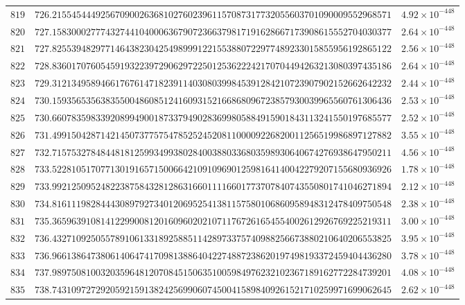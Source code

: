 \documentclass[12pt,reqno]{amsart}
\theoremstyle{remark}
\begin{document}
\begin{longtable}{clc}
$819$ & $726.2155454449256709002636810276023961157087317732055603701090009552968571$ & $4.92\times 10^{-448}$ \\
$820$ & $727.1583000277743274410400063679072366379817191628667173908615552704030377$ & $2.64\times 10^{-448}$ \\
$821$ & $727.8255394829771464382304254989991221553880722977489233015855956192865122$ & $2.56\times 10^{-448}$ \\
$822$ & $728.8360170760545919322397290629722501253622242170704494263213080397435186$ & $2.64\times 10^{-448}$ \\
$823$ & $729.3121349589466176761471823911403080399845391284210723907902152662642232$ & $2.44\times 10^{-448}$ \\
$824$ & $730.1593565356383550048608512416093152166868096723857930039965560761306436$ & $2.53\times 10^{-448}$ \\
$825$ & $730.6607835983392089949001873379490283699805884915901843113241550197685577$ & $2.52\times 10^{-448}$ \\
$826$ & $731.4991504287142145073775754785252452081100009226820011256519986897127882$ & $3.55\times 10^{-448}$ \\
$827$ & $732.7157532784844818125993499380284003880336803598930640674276938647950211$ & $4.56\times 10^{-448}$ \\
$828$ & $733.5228105170771301916571500664210910969012598164140042279207155680936926$ & $1.78\times 10^{-448}$ \\
$829$ & $733.9921250952482238758432812863166011116601773707840743550801741046271894$ & $2.12\times 10^{-448}$ \\
$830$ & $734.8161119828444308979273401206952541381157580106860958948312478409750548$ & $2.38\times 10^{-448}$ \\
$831$ & $735.3659639108141229900812016096020210711767261654554002612926769225219311$ & $3.00\times 10^{-448}$ \\
$832$ & $736.4327109250557891061331892588511428973375740988256673880210640206553825$ & $3.95\times 10^{-448}$ \\
$833$ & $736.9661386473806140647417098138864042274887238620197498193372459404436280$ & $3.78\times 10^{-448}$ \\
$834$ & $737.9897508100320359648120708451506351005984976232102367189162772284739201$ & $4.08\times 10^{-448}$ \\
$835$ & $738.7431097272920592159138242569906074500415898409261521710259971699062645$ & $2.62\times 10^{-448}$ \\

\end{longtable}
\end{document}
